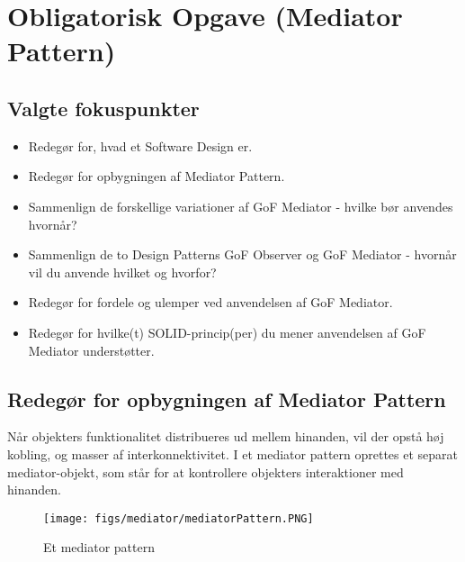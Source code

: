 \section{Obligatorisk Opgave (Mediator Pattern)}

\subsection{Valgte fokuspunkter}

\begin{itemize}
	\item Redegør for, hvad et Software Design er.
	\item Redegør for opbygningen af Mediator Pattern.
	\item Sammenlign de forskellige variationer af GoF Mediator - hvilke bør anvendes hvornår?
	\item Sammenlign de to Design Patterns GoF Observer og GoF Mediator - hvornår vil du anvende hvilket og hvorfor?
	\item Redegør for fordele og ulemper ved anvendelsen af GoF Mediator.
	\item Redegør for hvilke(t) SOLID-princip(per) du mener anvendelsen af GoF Mediator understøtter.
\end{itemize}



\subsection{Redegør for opbygningen af Mediator Pattern}
Når objekters funktionalitet distribueres ud mellem hinanden, vil der opstå høj kobling, og masser
af interkonnektivitet. I et mediator pattern oprettes et separat mediator-objekt, som står for at
kontrollere objekters interaktioner med hinanden.

\begin{figure}[H]
	\centering
	\texttt{[image: figs/mediator/mediatorPattern.PNG]}
	\caption{Et mediator pattern}
	\label{fig:mediatorPattern}
\end{figure}

